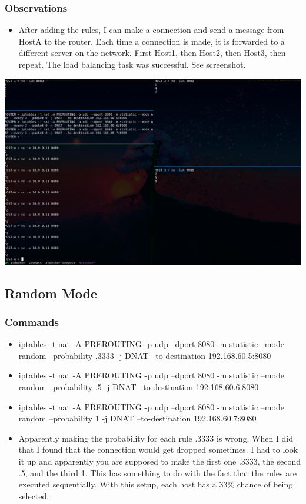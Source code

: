 \documentclass[11pt]{article}
\begin{document}
\subsubsection*{Observations}
\label{sec:orgc1246ed}
\begin{itemize}
\item After adding the rules, I can make a connection and send a message from HostA to the router. Each time a connection is made, it is forwarded to a different server on the network. First Host1, then Host2, then Host3, then repeat. The load balancing task was successful. See screenshot.
\end{itemize}
\begin{center}
\includegraphics[width=.9\linewidth]{./images/10.jpg}
\end{center}
\subsection*{Random Mode}
\label{sec:org864f283}
\subsubsection*{Commands}
\label{sec:org758e6e9}
\begin{itemize}
\item iptables -t nat -A PREROUTING -p udp --dport 8080 -m statistic --mode random --probability .3333 -j DNAT --to-destination 192.168.60.5:8080
\item iptables -t nat -A PREROUTING -p udp --dport 8080 -m statistic --mode random --probability .5 -j DNAT --to-destination 192.168.60.6:8080
\item iptables -t nat -A PREROUTING -p udp --dport 8080 -m statistic --mode random --probability 1 -j DNAT --to-destination 192.168.60.7:8080
\item Apparently making the probability for each rule .3333 is wrong. When I did that I found that the connection would get dropped sometimes. I had to look it up and apparently you are supposed to make the first one .3333, the second .5, and the third 1. This has something to do with the fact that the rules are executed sequentially. With this setup, each host has a 33\% chance of being selected.
\end{itemize}
\end{document}
